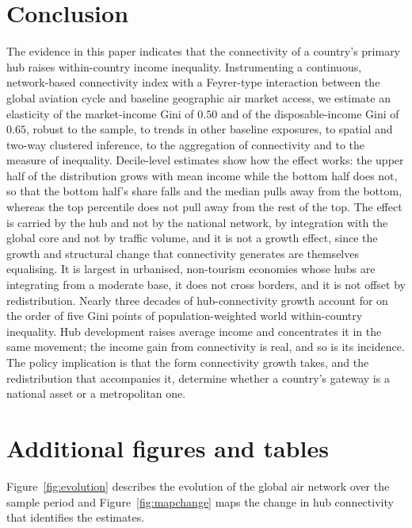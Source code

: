 \section{Conclusion}
\label{sec:conclusion}
The evidence in this paper indicates that the connectivity of a country's primary hub raises within-country income inequality. Instrumenting a continuous, network-based connectivity index with a Feyrer-type interaction between the global aviation cycle and baseline geographic air market access, we estimate an elasticity of the market-income Gini of $0.50$ and of the disposable-income Gini of $0.65$, robust to the sample, to trends in other baseline exposures, to spatial and two-way clustered inference, to the aggregation of connectivity and to the measure of inequality. Decile-level estimates show how the effect works: the upper half of the distribution grows with mean income while the bottom half does not, so that the bottom half's share falls and the median pulls away from the bottom, whereas the top percentile does not pull away from the rest of the top. The effect is carried by the hub and not by the national network, by integration with the global core and not by traffic volume, and it is not a growth effect, since the growth and structural change that connectivity generates are themselves equalising. It is largest in urbanised, non-tourism economies whose hubs are integrating from a moderate base, it does not cross borders, and it is not offset by redistribution. Nearly three decades of hub-connectivity growth account for on the order of five Gini points of population-weighted world within-country inequality. Hub development raises average income and concentrates it in the same movement; the income gain from connectivity is real, and so is its incidence. The policy implication is that the form connectivity growth takes, and the redistribution that accompanies it, determine whether a country's gateway is a national asset or a metropolitan one.

\appendix
\section{Additional figures and tables}
\label{sec:appendix}
Figure~\ref{fig:evolution} describes the evolution of the global air network over the sample period and Figure~\ref{fig:mapchange} maps the change in hub connectivity that identifies the estimates.

